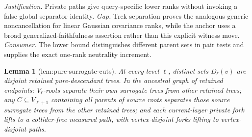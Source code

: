 \documentclass{article}
\newtheorem{lemma}{Lemma}
\begin{document}
\par\smallskip\noindent \textit{Justification.} Private paths give query-specific lower ranks without invoking a false global separator identity. \textit{Gap.} Trek separation proves the analogous generic noncancellation for linear Gaussian covariance ranks, while the anchor uses a broad generalized-faithfulness assertion rather than this explicit witness move. \textit{Consumer.} The lower bound distinguishes different parent sets in pair tests and supplies the exact one-rank neutrality increment.

\begin{lemma}[lem:pure-surrogate-cuts]\label{lem:pure-surrogate-cuts}
At every level \(\ell\), distinct sets \(D_\ell(v)\) are disjoint retained pure-descendant trees. In the ancestral graph of retained endpoints: \(V_\ell\)-roots separate their own surrogate trees from other retained trees; any \(C\subseteq V_{\ell+1}\) containing all parents of source roots separates those source surrogate trees from the other retained trees; and each current-layer private fork lifts to a collider-free measured path, with vertex-disjoint forks lifting to vertex-disjoint paths.
\end{lemma}
\end{document}
